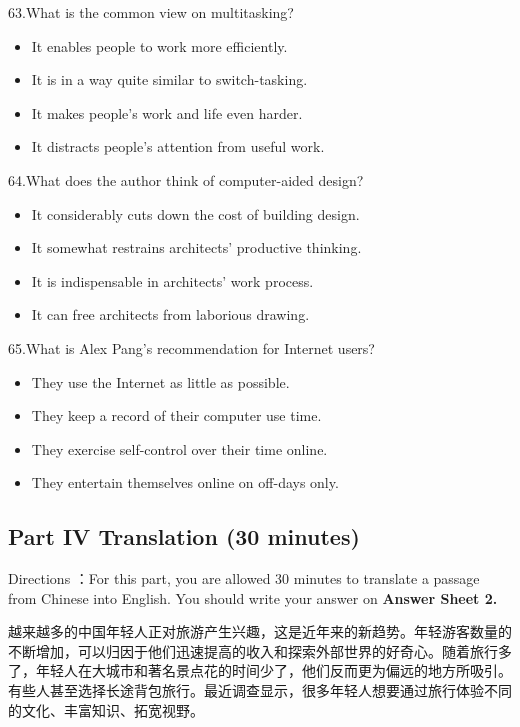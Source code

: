 \documentclass[UTF8,11pt]{ctexart}
\begin{document}
63.What is the common view on multitasking?


\begin{itemize}[leftmargin=2em,itemsep=.2em,topsep=.4em]\item[A.] It enables people to work more efficiently.
\item[B.] It is in a way quite similar to switch-tasking.
\item[C.] It makes people’s work and life even harder.
\item[D.] It distracts people’s attention from useful work.
\end{itemize}

64.What does the author think of computer-aided design?


\begin{itemize}[leftmargin=2em,itemsep=.2em,topsep=.4em]\item[A.] It considerably cuts down the cost of building design.
\item[B.] It somewhat restrains architects’ productive thinking.
\item[C.] It is indispensable in architects’ work process.
\end{itemize}

\begin{itemize}[leftmargin=2em,itemsep=.2em,topsep=.4em]\item[D.] It can free architects from laborious drawing.
\end{itemize}

65.What is Alex Pang’s recommendation for Internet users?


\begin{itemize}[leftmargin=2em,itemsep=.2em,topsep=.4em]\item[A.] They use the Internet as little as possible.
\item[B.] They keep a record of their computer use time.
\item[C.] They exercise self-control over their time online.
\item[D.] They entertain themselves online on off-days only.
\end{itemize}

\subsection*{Part IV Translation (30 minutes)}


Directions ：For this part, you are allowed 30 minutes to translate a passage from Chinese into English. You should write your answer on\textbf{ Answer Sheet 2.}


越来越多的中国年轻人正对旅游产生兴趣，这是近年来的新趋势。年轻游客数量的不断增加，可以归因于他们迅速提高的收入和探索外部世界的好奇心。随着旅行多了，年轻人在大城市和著名景点花的时间少了，他们反而更为偏远的地方所吸引。有些人甚至选择长途背包旅行。最近调查显示，很多年轻人想要通过旅行体验不同的文化、丰富知识、拓宽视野。
\end{document}
